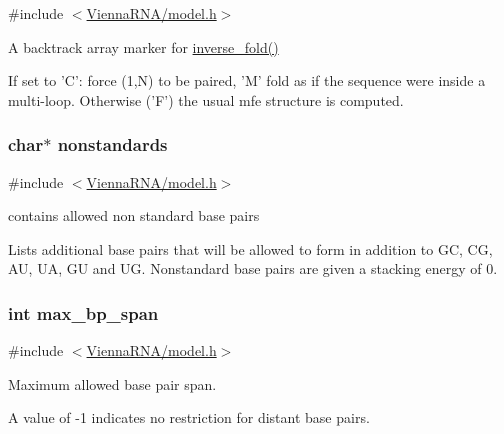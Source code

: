{\ttfamily \#include $<$\hyperlink{model_8h}{Vienna\-R\-N\-A/model.\-h}$>$}



A backtrack array marker for \hyperlink{group__inverse__fold_ga7af026de55d4babad879f2c92559cbbc}{inverse\-\_\-fold()} 

If set to 'C'\-: force (1,N) to be paired, 'M' fold as if the sequence were inside a multi-\/loop. Otherwise ('F') the usual mfe structure is computed. \hypertarget{group__model__details_ga2695d91cc535d09c2eae5c3884e2ec64}{
\subsubsection[{nonstandards}]{\setlength{\rightskip}{0pt plus 5cm}char$\ast$ nonstandards}}\label{group__model__details_ga2695d91cc535d09c2eae5c3884e2ec64}


{\ttfamily \#include $<$\hyperlink{model_8h}{Vienna\-R\-N\-A/model.\-h}$>$}



contains allowed non standard base pairs 

Lists additional base pairs that will be allowed to form in addition to G\-C, C\-G, A\-U, U\-A, G\-U and U\-G. Nonstandard base pairs are given a stacking energy of 0. \hypertarget{group__model__details_ga18df869af0d70101106458fc3f027806}{
\subsubsection[{max\-\_\-bp\-\_\-span}]{\setlength{\rightskip}{0pt plus 5cm}int max\-\_\-bp\-\_\-span}}\label{group__model__details_ga18df869af0d70101106458fc3f027806}


{\ttfamily \#include $<$\hyperlink{model_8h}{Vienna\-R\-N\-A/model.\-h}$>$}



Maximum allowed base pair span. 

A value of -\/1 indicates no restriction for distant base pairs. 